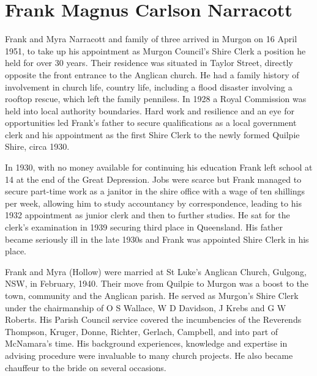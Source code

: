 \section{Frank Magnus Carlson Narracott}



Frank and Myra Narracott and family of three arrived in Murgon on 16 April 1951, to take up his appointment as Murgon Council's Shire Clerk a position he held for over 30 years. Their residence was situated in Taylor Street, directly opposite the front entrance to the Anglican church. He had a family history of involvement in church life, country life, including a flood disaster involving a rooftop rescue, which left the family penniless. In 1928 a Royal Commission was held into local authority boundaries. Hard work and resilience and an eye for opportunities led Frank's father to secure qualifications as a local government clerk and his appointment as the first Shire Clerk to the newly formed Quilpie Shire, circa 1930.



In 1930, with no money available for continuing his education Frank left school at 14 at the end of the Great Depression. Jobs were scarce but Frank managed to secure part-time work as a janitor in the shire office with a wage of ten shillings per week, allowing him to study accountancy by correspondence, leading to his 1932 appointment as junior clerk and then to further studies. He sat for the clerk's examination in 1939 securing third place in Queensland. His father became seriously ill in the late 1930s and Frank was appointed Shire Clerk in his place.



Frank and Myra (Hollow) were married at St Luke's Anglican Church, Gulgong, NSW, in February, 1940. Their move from Quilpie to Murgon was a boost to the town, community and the Anglican parish. He served as Murgon's Shire Clerk under the chairmanship of O S Wallace, W D Davidson, J Krebs and G W Roberts. His Parish Council service covered the incumbencies of the Reverends Thompson, Kruger, Donne, Richter, Gerlach, Campbell, and into part of McNamara's time. His background experiences, knowledge and expertise in advising procedure were invaluable to many church projects. He also became chauffeur to the bride on several occasions.



